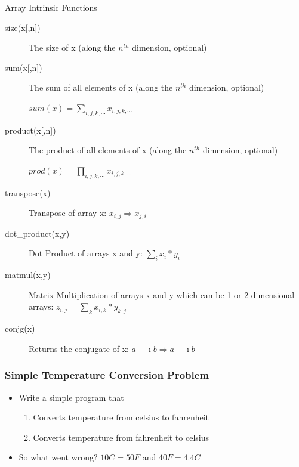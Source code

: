 \documentclass[10pt,t]{beamer}
\begin{document}
\begin{frame}{Array Intrinsic Functions}
  \footnotesize
  \begin{description}
    \item[{size(x[,n])}] The size of x (along the $n^{th}$ dimension, optional)
    \item[{sum(x[,n])}] The sum of all elements of x (along the $n^{th}$ dimension, optional)
    \item[] $sum(x) = \sum_{i,j,k,\cdots}x_{i,j,k,\cdots}$
    \item[{product(x[,n])}] The product of all elements of x (along the $n^{th}$ dimension, optional)
    \item[] $prod(x) = \prod_{i,j,k,\cdots}x_{i,j,k,\cdots}$
    \item[transpose(x)] Transpose of array x: $ x_{i,j}\Rightarrow x_{j,i}$
    \item[dot\_product(x,y)] Dot Product of arrays x and y: $ \sum_{i} x_i* y_i $
    \item[matmul(x,y)] Matrix Multiplication of arrays x and y which can be 1 or 2 dimensional arrays: $ z_{i,j} = \sum_k x_{i,k} * y_{k,j}$
    \item[conjg(x)] Returns the conjugate of x: $ a + \imath b \Rightarrow a - \imath b$
  \end{description}
\end{frame}

\begin{frame}[fragile]
  \frametitle{Simple Temperature Conversion Problem}
  \begin{itemize}
    \item Write a simple program that 
    \begin{enumerate}
      \item Converts temperature from celsius to fahrenheit
      \item Converts temperature from fahrenheit to celsius
    \end{enumerate}
      \begin{columns}[t]
        Fortran},basicstyle=\fontsize{6}{5}\selectfont\ttfamily]{./Exercise/simple.f90}
        \column{0.6\textwidth}
        \begin{lstlisting}[basicstyle=\fontsize{6}{5}\selectfont\ttfamily]
altair:Exercise apacheco$ gfortran simple.f90
altair:Exercise apacheco$ ./a.out 
 10C =    42.0000000     F
 40F =    0.00000000     C
        \end{lstlisting}
      \end{columns}
    \item So what went wrong? $10C = 50F$ and $40F = 4.4C$
  \end{itemize}
\end{frame}
\end{document}
